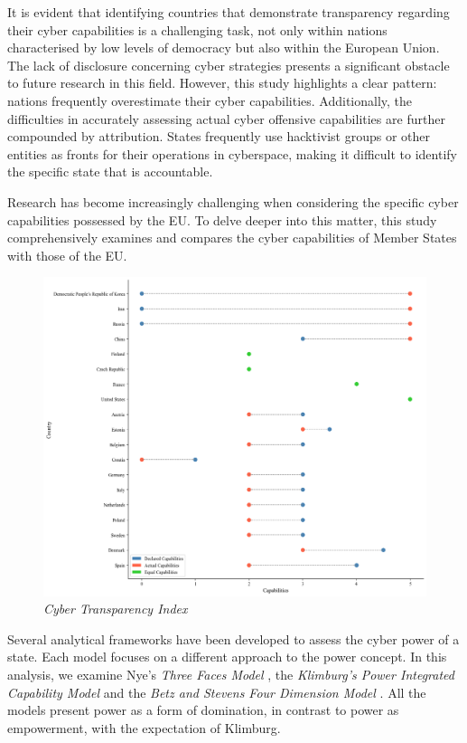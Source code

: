 It is evident that identifying countries that demonstrate transparency regarding their cyber capabilities is a challenging task, not only within nations characterised by low levels of democracy but also within the European Union. The lack of disclosure concerning cyber strategies presents a significant obstacle to future research in this field. However, this study highlights a clear pattern: nations frequently overestimate their cyber capabilities. Additionally, the difficulties in accurately assessing actual cyber offensive capabilities are further compounded by attribution. States frequently use hacktivist groups or other entities as fronts for their operations in cyberspace, making it difficult to identify the specific state that is accountable.

Research has become increasingly challenging when considering the specific cyber capabilities possessed by the EU. To delve deeper into this matter, this study comprehensively examines and compares the cyber capabilities of Member States with those of the EU.

\begin{figure}[H]
    \centering
    \includegraphics[width=1\textwidth]{Images/cybercap.png}
    \caption{\textit{Cyber Transparency Index \autocite[4]{faesen_2022_cyber}}}
    \label{fig:cybercap}
\end{figure}

Several analytical frameworks have been developed to assess the cyber power of a state. Each model focuses on a different approach to the power concept. In this analysis, we examine Nye’s \textit{Three Faces Model } \autocite{nye_2010_cyber}, the\textit{ Klimburg’s Power Integrated Capability Model} \autocite{klimburg_2011_cybersecurity} and the \textit{Betz and Stevens Four Dimension Model} \autocite{betz_2011_cyberspace}. All the models present power as a form of domination, in contrast to power as empowerment, \parencite{haugaard_2012_rethinking, dunncavelty_2018_europes} with the expectation of Klimburg.


